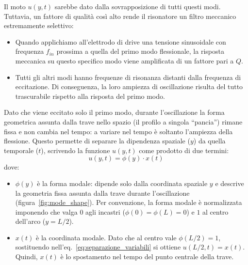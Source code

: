 \documentclass[11pt,a4paper]{article}
\begin{document}
\vspace{0.3cm}

\noindent Il moto $u(y, t)$ sarebbe dato dalla sovrapposizione di tutti questi modi. Tuttavia, un fattore di qualità così alto rende il risonatore un filtro meccanico estremamente selettivo:
\begin{itemize}
    \item Quando applichiamo all'elettrodo di drive una tensione sinusoidale con frequenza $f_{in}$ prossima a quella del primo modo flessionale, la risposta meccanica su questo specifico modo viene amplificata di un fattore pari a $Q$.
    \item Tutti gli altri modi hanno frequenze di risonanza distanti dalla frequenza di eccitazione. Di conseguenza, la loro ampiezza di oscillazione risulta del tutto trascurabile rispetto alla risposta del primo modo.
\end{itemize}
\newpage

\noindent Dato che viene eccitato solo il primo modo, durante l'oscillazione la forma geometrica assunta dalla trave nello spazio (il profilo a singola ``pancia'') rimane fissa e non cambia nel tempo: a variare nel tempo è soltanto l'ampiezza della flessione. Questo permette di separare la dipendenza spaziale ($y$) da quella temporale ($t$), scrivendo la funzione $u(y, t)$ come prodotto di due termini:
\begin{equation}
    \label{eq:separazione_variabili}
    u(y, t) = \phi(y) \cdot x(t)
\end{equation}
dove:
\begin{itemize}
    \item $\phi(y)$ è la forma modale: dipende solo dalla coordinata spaziale $y$ e descrive la geometria fissa assunta dalla trave durante l'oscillazione (figura~\ref{fig:mode_shape}). Per convenzione, la forma modale è normalizzata imponendo che valga $0$ agli incastri ($\phi(0) = \phi(L) = 0$) e $1$ al centro dell'arco ($y = L/2$).
    \item $x(t)$ è la coordinata modale. Dato che al centro vale $\phi(L/2) = 1$, sostituendo nell'eq.~\eqref{eq:separazione_variabili} si ottiene $u(L/2, t) = x(t)$. Quindi, $x(t)$ è lo spostamento nel tempo del punto centrale della trave.
\end{itemize}
\end{document}
